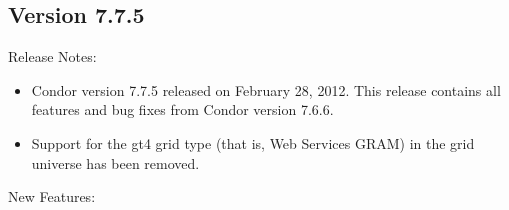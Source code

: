 \subsection*{\label{sec:New-7-7-5}Version 7.7.5}

\noindent Release Notes:

\begin{itemize}

\item Condor version 7.7.5 released on February 28, 2012.
This release contains all features and bug fixes from Condor version 7.6.6. 

\item Support for the gt4 grid type (that is, Web Services GRAM) in the grid
universe has been removed.

\end{itemize}


\noindent New Features:

